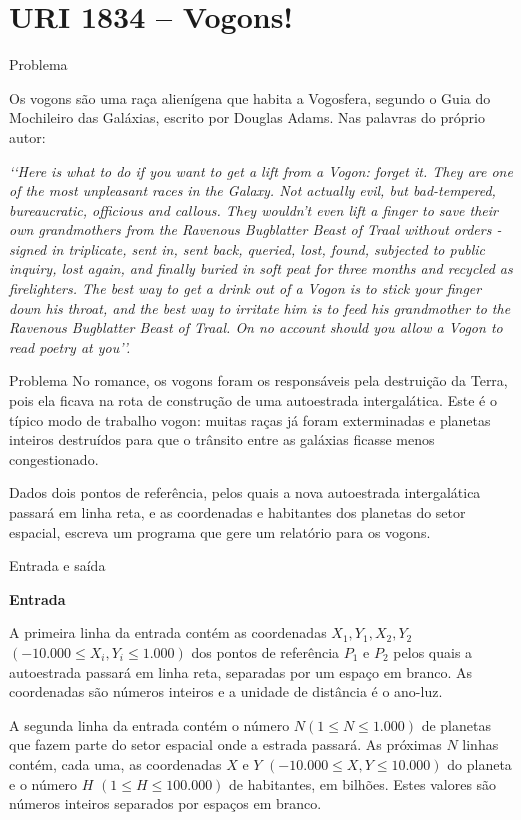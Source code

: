 \section{URI 1834 -- Vogons!}

\begin{frame}[fragile]{Problema}

Os vogons são uma raça alienígena que habita a Vogosfera, segundo o Guia do Mochileiro das Galáxias, escrito por Douglas Adams. Nas palavras do próprio autor:

\textit{
\lq\lq Here is what to do if you want to get a lift from a Vogon: forget it. They are one of the most unpleasant races in the Galaxy. Not actually evil, but bad-tempered, bureaucratic, officious and callous. They wouldn't even lift a finger to save their own grandmothers from the Ravenous Bugblatter Beast of Traal without orders - signed in triplicate, sent in, sent back, queried, lost, found, subjected to public inquiry, lost again, and finally buried in soft peat for three months and recycled as firelighters. The best way to get a drink out of a Vogon is to stick your finger down his throat, and the best way to irritate him is to feed his grandmother to the Ravenous Bugblatter Beast of Traal. On no account should you allow a Vogon to read poetry at you\rq\rq.
}

\end{frame}

\begin{frame}[fragile]{Problema}
No romance, os vogons foram os responsáveis pela destruição da Terra, pois ela ficava na rota de construção de uma autoestrada intergalática. Este é o típico modo de trabalho vogon: muitas raças já foram exterminadas e planetas inteiros destruídos para que o trânsito entre as galáxias ficasse menos congestionado.

Dados dois pontos de referência, pelos quais a nova autoestrada intergalática passará em linha reta, e as coordenadas e habitantes dos planetas do setor espacial, escreva um programa que gere um relatório para os vogons.

\end{frame}

\begin{frame}[fragile]{Entrada e saída}

\textbf{Entrada}

A primeira linha da entrada contém as coordenadas $X_1, Y_1, X_2, Y_2$ $(-10.000 \leq X_i, Y_i \leq 1.000)$ 
dos pontos de referência $P_1$ e $P_2$ pelos quais a autoestrada passará em linha reta, separadas por um espaço em branco. As coordenadas são números inteiros e a unidade de distância é o ano-luz.

A segunda linha da entrada contém o número $N (1 \leq N \leq 1.000)$ de planetas que fazem parte do 
setor espacial onde a estrada passará. As próximas $N$ linhas contém, cada uma, as coordenadas $X$ e $Y$ $(-10.000 \leq X, Y \leq 10.000)$ do planeta e o número $H$ $(1 \leq H \leq 100.000)$ de habitantes, em bilhões. Estes valores são números inteiros separados por espaços em branco.
\end{frame}

